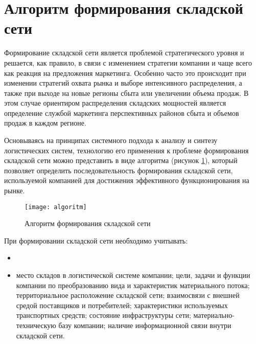 \section{Алгоритм формирования складской сети}

Формирование складской сети является проблемой стратегического уровня и решается, как правило, в связи с изменением стратегии компании и чаще всего как реакция на предложения маркетинга.
Особенно часто это происходит при изменении стратегий охвата рынка и выборе интенсивного распределения, а также при выходе на новые регионы сбыта или увеличении объема продаж.
В этом случае ориентиром распределения складских мощностей является определение службой маркетинга перспективных районов сбыта и объемов продаж в каждом регионе.

Основываясь на принципах системного подхода к анализу и синтезу логистических систем, технологию его применения к проблеме формирования складской сети можно представить в виде алгоритма (рисунок \ref{fig:algoritm}), который позволяет определить последовательность формирования складской сети, используемой компанией для достижения эффективного функционирования на рынке.


\begin{figure}[h]
	\centering
	\texttt{[image: algoritm]}
	\caption{Алгоритм формирования складской сети}
	\label{fig:algoritm}
\end{figure}

При формировании складской сети необходимо учитывать:
\begin{itemize}
	\item \item  место складов в логистической системе компании; цели, задачи и функции компании по преобразованию вида и характеристик материального потока; территориальное расположение складской сети; взаимосвязи с внешней средой поставщиков и потребителей; характеристики используемых транспортных средств; состояние инфраструктуры сети; материально-техническую базу компании; наличие информационной связи внутри складской сети.
\end{itemize}